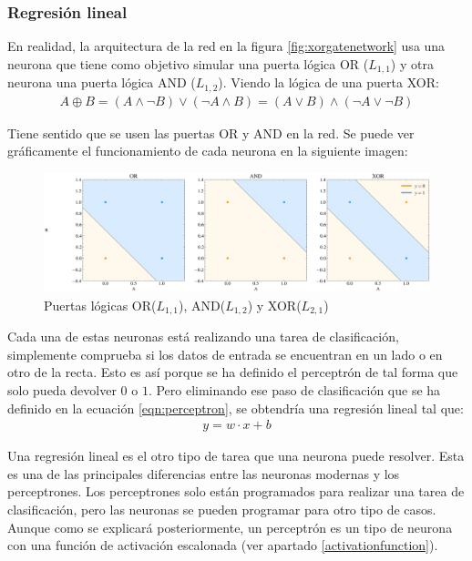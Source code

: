 \subsubsection{Regresión lineal}


En realidad, la arquitectura de la red en la figura \ref{fig:xorgatenetwork} usa una neurona que tiene como objetivo simular una puerta lógica OR ($L_{1,1}$) y otra neurona una puerta lógica AND ($L_{1,2}$). Viendo la lógica de una puerta XOR:
\begin{eqnarray}
    A \oplus B = (A \land \neg B) \lor (\neg A \land B) = (A \lor B) \land (\neg A \lor \neg B)
\end{eqnarray}

Tiene sentido que se usen las puertas OR y AND en la red. Se puede ver gráficamente el funcionamiento de cada neurona en la siguiente imagen:
\begin{figure}[H]
    \centering
    \includegraphics[width=15cm]{images/state-of-art/regression/xor.png}
    \caption{Puertas lógicas OR($L_{1,1}$), AND($L_{1,2}$) y XOR($L_{2,1}$)}
    \label{fig:orandxorgraph}
\end{figure}

Cada una de estas neuronas está realizando una tarea de clasificación, simplemente comprueba si los datos de entrada se encuentran en un lado o en otro de la recta. Esto es así porque se ha definido el perceptrón de tal forma que solo pueda devolver $0$ o $1$. Pero eliminando ese paso de clasificación que se ha definido en la ecuación \ref{eqn:perceptron}, se obtendría una regresión lineal tal que:
\begin{eqnarray}
  y = w \cdot x + b
      \label{eqn:neuronsimple}
\end{eqnarray}

Una regresión lineal es el otro tipo de tarea que una neurona puede resolver. Esta es una de las principales diferencias entre las neuronas modernas y los perceptrones. Los perceptrones solo están programados para realizar una tarea de clasificación, pero las neuronas se pueden programar para otro tipo de casos. Aunque como se explicará posteriormente, un perceptrón es un tipo de neurona con una función de activación escalonada (ver apartado \ref{activationfunction}).
\newline

